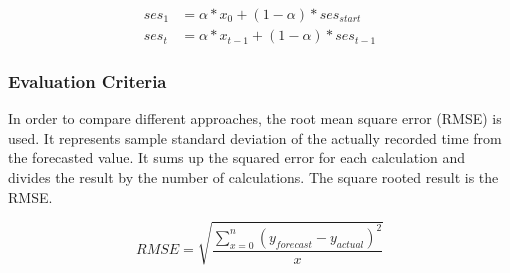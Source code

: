 \begin{equation}
  \begin{align}
  	ses_1 &= \alpha * x_{0} + (1 - \alpha) * ses_{start} \\
  	ses_t&=\alpha*x_{t-1}+(1-\alpha)*ses_{t-1}
  \end{align}
\end{equation}


\subsubsection{Evaluation Criteria}
In order to compare different approaches, the root mean square error (RMSE) is used. It represents sample standard deviation of the actually recorded time from the forecasted value. It sums up the squared error for each calculation and divides the result by the number of calculations.\newline
The square rooted result is the RMSE.
\begin{center}
\begin{equation}
RMSE = \sqrt{\frac{\sum^{n}_{x=0}{(y_{forecast} - y_{actual})^{2}}}{x}}
\end{equation}
\end{center}
